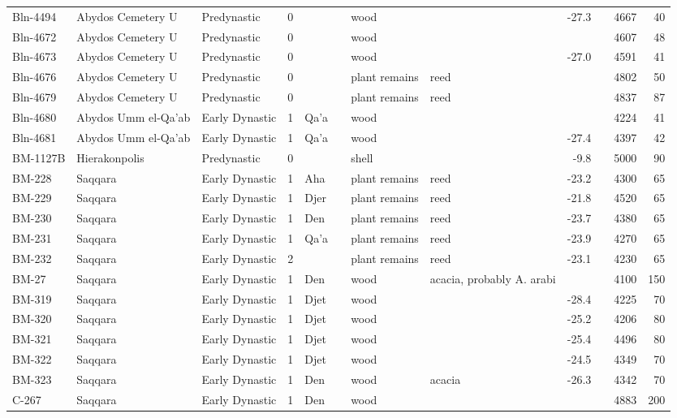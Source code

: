 \documentclass[a4paper,8pt]{article}
\begin{document}
\begin{landscape}
\begin{center}
\begin{longtable}{|l|>{\raggedright}p{20ex}|l|r|l|>{\raggedright}p{25ex}|l|l|r|l|r|r|}
Bln-4494 & Abydos Cemetery U & Predynastic & 0 &  &  & wood &  & -27.3 &  & 4667 & 40\\
Bln-4672 & Abydos Cemetery U & Predynastic & 0 &  &  & wood &  &   &  & 4607 & 48\\
Bln-4673 & Abydos Cemetery U & Predynastic & 0 &  &  & wood &  & -27.0 &  & 4591 & 41\\
Bln-4676 & Abydos Cemetery U & Predynastic & 0 &  &  & plant remains & reed &   &  & 4802 & 50\\
Bln-4679 & Abydos Cemetery U & Predynastic & 0 &  &  & plant remains & reed &   &  & 4837 & 87\\
Bln-4680 & Abydos Umm el-Qa'ab & Early Dynastic & 1 & Qa'a &  & wood &  &   &  & 4224 & 41\\
Bln-4681 & Abydos Umm el-Qa'ab & Early Dynastic & 1 & Qa'a &  & wood &  & -27.4 &  & 4397 & 42\\
BM-1127B & Hierakonpolis & Predynastic & 0 &  &  & shell &  & -9.8 &  & 5000 & 90\\
BM-228 & Saqqara & Early Dynastic & 1 & Aha &  & plant remains & reed & -23.2 &  & 4300 & 65\\
BM-229 & Saqqara & Early Dynastic & 1 & Djer &  & plant remains & reed & -21.8 &  & 4520 & 65\\
BM-230 & Saqqara & Early Dynastic & 1 & Den &  & plant remains & reed & -23.7 &  & 4380 & 65\\
BM-231 & Saqqara & Early Dynastic & 1 & Qa'a &  & plant remains & reed & -23.9 &  & 4270 & 65\\
BM-232 & Saqqara & Early Dynastic & 2 &  &  & plant remains & reed & -23.1 &  & 4230 & 65\\
BM-27 & Saqqara & Early Dynastic & 1 & Den &  & wood & acacia, probably A. arabi &   &  & 4100 & 150\\
BM-319 & Saqqara & Early Dynastic & 1 & Djet &  & wood &  & -28.4 &  & 4225 & 70\\
BM-320 & Saqqara & Early Dynastic & 1 & Djet &  & wood &  & -25.2 &  & 4206 & 80\\
BM-321 & Saqqara & Early Dynastic & 1 & Djet &  & wood &  & -25.4 &  & 4496 & 80\\
BM-322 & Saqqara & Early Dynastic & 1 & Djet &  & wood &  & -24.5 &  & 4349 & 70\\
BM-323 & Saqqara & Early Dynastic & 1 & Den &  & wood & acacia & -26.3 &  & 4342 & 70\\
C-267 & Saqqara & Early Dynastic & 1 & Den &  & wood &  &   &  & 4883 & 200\\

\end{longtable}
\end{center}
\end{landscape}
\end{document}
